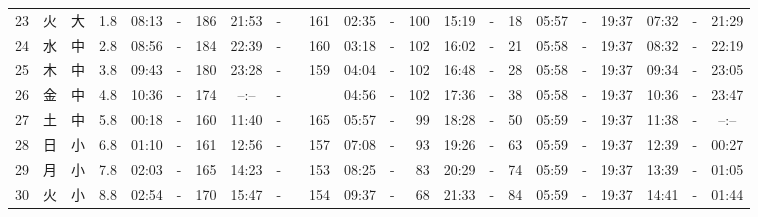 \documentclass[12pt,a4j]{jsarticle}
\begin{document}
\begin{table}[htbp]
\begin{center}
{\begin{tabular}{|rc|cr|ccrccr|ccrccr|ccc|ccc|}
23 & 火 & 大 &  1.8 &  08:13 &-& 186 &  21:53 &-& 161 &  02:35 &-& 100 &  15:19 &-&  18 & 05:57 & -& 19:37 & 07:32 & -& 21:29 \\
24 & 水 & 中 &  2.8 &  08:56 &-& 184 &  22:39 &-& 160 &  03:18 &-& 102 &  16:02 &-&  21 & 05:58 & -& 19:37 & 08:32 & -& 22:19 \\
25 & 木 & 中 &  3.8 &  09:43 &-& 180 &  23:28 &-& 159 &  04:04 &-& 102 &  16:48 &-&  28 & 05:58 & -& 19:37 & 09:34 & -& 23:05 \\
26 & 金 & 中 &  4.8 &  10:36 &-& 174 &  --:-- &-&~~~~~ &  04:56 &-& 102 &  17:36 &-&  38 & 05:58 & -& 19:37 & 10:36 & -& 23:47 \\
27 & 土 & 中 &  5.8 &  00:18 &-& 160 &  11:40 &-& 165 &  05:57 &-&  99 &  18:28 &-&  50 & 05:59 & -& 19:37 & 11:38 & -& --:-- \\
28 & 日 & 小 &  6.8 &  01:10 &-& 161 &  12:56 &-& 157 &  07:08 &-&  93 &  19:26 &-&  63 & 05:59 & -& 19:37 & 12:39 & -& 00:27 \\
29 & 月 & 小 &  7.8 &  02:03 &-& 165 &  14:23 &-& 153 &  08:25 &-&  83 &  20:29 &-&  74 & 05:59 & -& 19:37 & 13:39 & -& 01:05 \\
30 & 火 & 小 &  8.8 &  02:54 &-& 170 &  15:47 &-& 154 &  09:37 &-&  68 &  21:33 &-&  84 & 05:59 & -& 19:37 & 14:41 & -& 01:44 \\
   \hline
   \end{tabular}}
   \end{center}
\end{table}
\newpage
\end{document}
